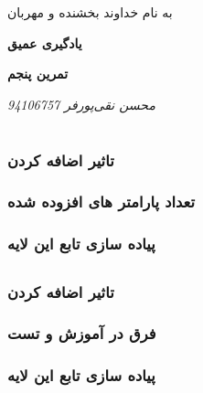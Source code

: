 \documentclass{article}
\begin{document}
\begin{titlepage}
	\centering
	{\scshape\LARGE به نام خداوند بخشنده و مهربان \par}
	\vspace{2cm}
	{\huge\bfseries یادگیری عمیق\par}
	\vspace{3cm}
	{\Large\bfseries  تمرین پنجم \par}
	\vspace{3cm}
	{\Large\itshape 		محسن نقی‌پورفر		94106757\par}
	\vspace{0.25cm}
	\vfill
	\end{titlepage}
\section{}
\subsection{}
\subsubsection{تاثیر اضافه کردن }
\subsubsection{تعداد پارامتر های افزوده شده}
\subsubsection{پیاده سازی تابع این لایه}
\subsection{}
\subsubsection{تاثیر اضافه کردن }
\subsubsection{فرق در آموزش و تست}
\subsubsection{پیاده سازی تابع این لایه}
\end{document}

